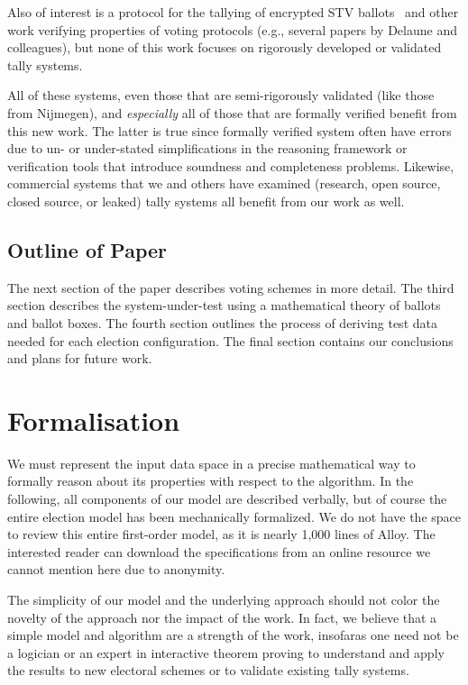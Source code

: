 \documentclass[runningheads,a4paper]{llncs}
\begin{document}
Also of interest is a protocol for the tallying of encrypted STV
ballots~\cite{TeagueEtAl08} and other work verifying properties of
voting protocols (e.g., several papers by Delaune and colleagues), but
none of this work focuses on rigorously developed or validated tally
systems.

All of these systems, even those that are semi-rigorously validated
(like those from Nijmegen), and \emph{especially} all of those that
are formally verified benefit from this new work.  The latter is true
since formally verified system often have errors due to un- or
under-stated simplifications in the reasoning framework or
verification tools that introduce soundness and completeness problems.
Likewise, commercial systems that we and others have examined
(research, open source, closed source, or leaked) tally systems all
benefit from our work as well.

\subsection{Outline of Paper}

The next section of the paper describes voting schemes in more detail.
The third section describes the system-under-test using a mathematical
theory of ballots and ballot boxes.  The fourth section outlines the
process of deriving test data needed for each election configuration.
The final section contains our conclusions and plans for future work.

\section{Formalisation}
\label{sec:theory-pref-ball}

We must represent the input data space in a precise mathematical way
to formally reason about its properties with respect to the algorithm.
In the following, all components of our model are described verbally,
but of course the entire election model has been mechanically
formalized.  We do not have the space to review this entire
first-order model, as it is nearly 1,000 lines of Alloy.  The
interested reader can download the specifications from an online
resource we cannot mention here due to anonymity.

The simplicity of our model and the underlying approach should not
color the novelty of the approach nor the impact of the work.  In
fact, we believe that a simple model and algorithm are a strength of
the work, insofaras one need not be a logician or an expert in
interactive theorem proving to understand and apply the results to new
electoral schemes or to validate existing tally systems.
\end{document}
